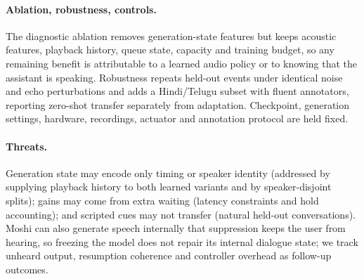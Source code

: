 \documentclass[11pt,a4paper,twocolumn]{article}
\begin{document}
\paragraph{Ablation, robustness, controls.} The diagnostic ablation removes generation-state features but keeps acoustic features, playback history, queue state, capacity and training budget, so any remaining benefit is attributable to a learned audio policy or to knowing that the assistant is speaking. Robustness repeats held-out events under identical noise and echo perturbations and adds a Hindi/Telugu subset with fluent annotators, reporting zero-shot transfer separately from adaptation. Checkpoint, generation settings, hardware, recordings, actuator and annotation protocol are held fixed.

\paragraph{Threats.} Generation state may encode only timing or speaker identity (addressed by supplying playback history to both learned variants and by speaker-disjoint splits); gains may come from extra waiting (latency constraints and hold accounting); and scripted cues may not transfer (natural held-out conversations). Moshi can also generate speech internally that suppression keeps the user from hearing, so freezing the model does not repair its internal dialogue state; we track unheard output, resumption coherence and controller overhead as follow-up outcomes.
\end{document}
